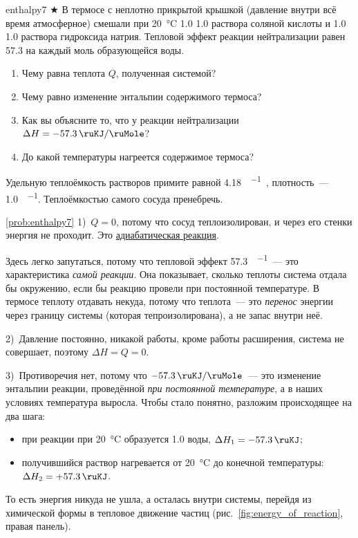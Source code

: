 \begin{problem}{}{enthalpy7}
    $\bigstar$ В термосе с неплотно прикрытой крышкой (давление внутри всё время атмосферное) смешали при \qty{20}{\degreeCelsius} \qty{1,0}{\ruL} \qty{1,0}{\ruMolar} раствора соляной кислоты и \qty{1,0}{\ruL} \qty{1,0}{\ruMolar} раствора гидроксида натрия. Тепловой эффект реакции нейтрализации равен \qty{57,3}{\ruKJ} на каждый моль образующейся воды.

    \begin{enumerate}[label=\arabic*)]
        \item Чему равна теплота $Q$, полученная системой?
        \item Чему равно изменение энтальпии содержимого термоса?
        \item Как вы объясните то, что у реакции нейтрализации $\Delta{}H = \qty{-57,3}{\ruKJ\per\ruMole}$?
        \item До какой температуры нагреется содержимое термоса?
    \end{enumerate}
    Удельную теплоёмкость растворов примите равной \qty{4,18}{\ruJ\per\ruG\ruK}, плотность~--- \qty{1,0}{\ruG\per\ruMl}. Теплоёмкостью самого сосуда пренебречь.
    \begin{sol}{\ref{prob:enthalpy7}}
        1)~$Q = 0$, потому что сосуд теплоизолирован, и через его стенки энергия не проходит. Это \hyperref[term:adiabatic_reaction]{адиабатическая реакция}.

        Здесь легко запутаться, потому что тепловой эффект \qty{57,3}{\ruKJ\per\ruMole}~--- это характеристика \emph{самой реакции}. Она показывает, сколько теплоты система отдала бы окружению, если бы реакцию провели при постоянной температуре. В термосе теплоту отдавать некуда, потому что теплота~--- это \emph{перенос} энергии через границу системы (которая тепроизолирована), а не запас внутри неё.

        2)~Давление постоянно, никакой работы, кроме работы расширения, система не совершает, поэтому $\Delta{}H = Q = 0$.

        3)~Противоречия нет, потому что $\qty{-57,3}{\ruKJ\per\ruMole}$~--- это изменение энтальпии реакции, проведённой \emph{при постоянной температуре}, а в наших условиях температура выросла. Чтобы стало понятно, разложим происходящее на два шага:
        \begin{itemize}
            \item при реакции при \qty{20}{\degreeCelsius} образуется \qty{1,0}{\ruMole} воды, $\Delta{}H_1 = \qty{-57,3}{\ruKJ}$;
            \item получившийся раствор нагревается от \qty{20}{\degreeCelsius} до конечной температуры: $\Delta{}H_2 = +\qty{57,3}{\ruKJ}$.
        \end{itemize}
        То есть энергия никуда не ушла, а осталась внутри системы, перейдя из химической формы в тепловое движение частиц (рис.~\ref{fig:energy_of_reaction}, правая панель).


\end{sol}
\end{problem}
